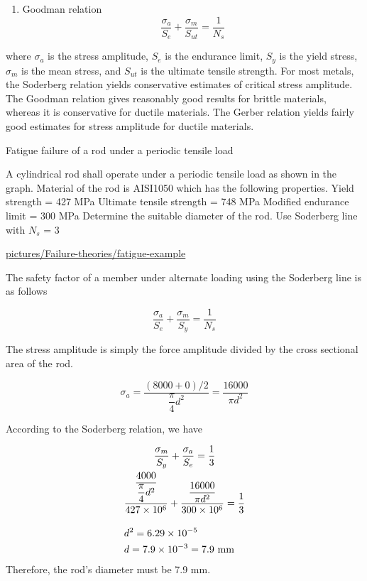 \documentclass[a4paper,openany,12pt]{book}
\begin{document}
{{\begin{enumerate}
\item Goodman relation
$$\frac{\sigma_a}{S_e} + \frac{\sigma _m}{S_{ut}} = \frac{1}{N_s}$$
\end{enumerate}

where \(\sigma_a\) is the stress amplitude, \(S_e\) is the endurance limit,
\(S_y\) is the yield stress, \(\sigma_m\) is the mean stress, and \(S_{ut}\)
is the ultimate tensile strength. For most metals, the Soderberg
relation yields conservative estimates of critical stress amplitude. The
Goodman relation gives reasonably good results for brittle materials,
whereas it is conservative for ductile materials. The Gerber relation
yields fairly good estimates for stress amplitude for ductile materials.

Fatigue failure of a rod under a periodic tensile load

A cylindrical rod shall operate under a periodic tensile load as shown
in the graph. Material of the rod is AISI1050 which has the following
properties. Yield strength = 427 MPa Ultimate tensile strength = 748 MPa
Modified endurance limit = 300 MPa Determine the suitable diameter of
the rod. Use Soderberg line with \(N_s\) = 3


\url{pictures/Failure-theories/fatigue-example}

The safety factor of a member under alternate loading using the
Soderberg line is as follows

$$\frac{\sigma_a}{S_e} + \frac{\sigma_m}{S_y} = \frac{1}{N_s}$$

The stress amplitude is simply the force amplitude divided by the cross
sectional area of the rod.

$$\sigma_a = \frac{(8000 + 0)/2}{\dfrac{\pi }{4}d^2} = \frac{16000}{\pi d^2}$$

According to the Soderberg relation, we have

$$\begin{gathered}
    \frac{\sigma_m}{S_y} + \frac{\sigma _a}{S_e} = \frac{1}{3} \\ 
    \dfrac{\dfrac{4000}{\dfrac{\pi }{4}d^2}}{427 \times 10^6} + \dfrac{\dfrac{16000}{\pi d^2}}{300 \times 10^6} = \frac{1}{3} \\[1em] 
    d^2 = 6.29 \times 10^{-5} \hfill \\
    d = 7.9 \times 10^{-3} = 7.9 \text{ mm} \hfill \\ 
  \end{gathered}$$ Therefore, the rod's diameter must be 7.9 mm.

}}
\end{document}
